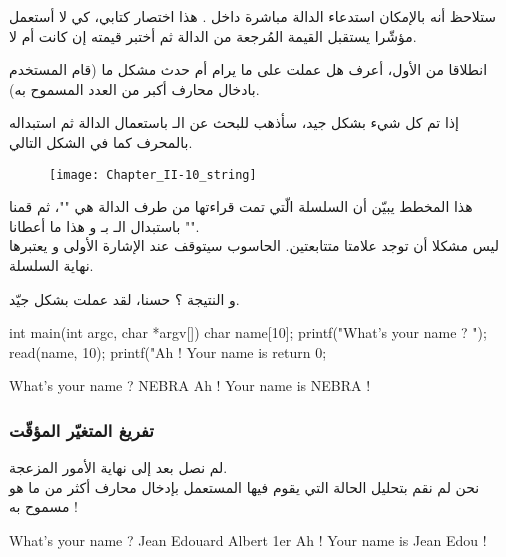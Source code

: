 ستلاحظ أنه بالإمكان استدعاء الدالة
مباشرة داخل
.
هذا اختصار كتابي، كي لا أستعمل مؤشّرا يستقبل القيمة المُرجعة من الدالة ثم أختبر قيمته إن كانت
أم لا.

انطلاقا من
الأول، أعرف هل
عملت على ما يرام أم حدث مشكل ما (قام المستخدم بادخال محارف أكبر من العدد المسموح به).

إذا تم كل شيء بشكل جيد، سأذهب للبحث عن الـ
باستعمال الدالة
ثم استبداله بالمحرف
كما في الشكل التالي.

\begin{figure}[H]
	\centering
	\texttt{[image: Chapter\_II-10\_string]}
\end{figure}

هذا المخطط يبيّن أن السلسلة الّتي تمت قراءتها من طرف الدالة
هي
""،
ثم قمنا باستبدال الـ
بـ
و هذا ما أعطانا
"".\\
ليس مشكلا أن توجد علامتا
متتابعتين. الحاسوب سيتوقف عند الإشارة الأولى و يعتبرها نهاية السلسلة.

و النتيجة ؟ حسنا، لقد عملت بشكل جيّد.

\begin{Csource}
  int main(int argc, char *argv[])
  {
  	char name[10];
  	printf("What's your name ? ");
  	read(name, 10);
  	printf("Ah ! Your name is %
  	return 0;
  }
\end{Csource}

\begin{Console}
What's your name ? NEBRA
Ah ! Your name is NEBRA !
\end{Console}

\subsubsection{تفريغ المتغيّر المؤقّت}

لم نصل بعد إلى نهاية الأمور المزعجة.\\
نحن لم نقم بتحليل الحالة التي يقوم فيها المستعمل بإدخال محارف أكثر من ما هو مسموح به !

\begin{Console}
What's your name ? Jean Edouard Albert 1er
Ah ! Your name is Jean Edou !
\end{Console}


